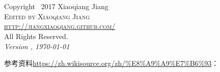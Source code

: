 \documentclass[8pt]{book}
\makeatletter
\renewcommand{\cleardoublepage}{
	\clearpage\ifodd\c@page\else
	\hbox{}
	\vspace*{\fill}
	\thispagestyle{empty}
	\newpage
	\fi}
\numberwithin{dummy}{section}
\theoremstyle{ocrenumbox}
\theoremstyle{blacknumex}
\theoremstyle{blacknumbox}
\theoremstyle{ocrenum}
\newif\ifusechapterimage
\newcommand{\thechapterimage}{}%
\newcommand{\chapterimage}[1]{\ifusechapterimage\renewcommand{\thechapterimage}{#1}\fi}%
\makeatother
\begin{document}

\newpage
~\vfill
\thispagestyle{empty}


\newpage
~\vfill
\thispagestyle{empty}

\noindent Copyright \textcopyright\ 2017 Xiaoqiang Jiang\\ %

\noindent \textsc{Edited by Xiaoqiang Jiang}\\ %

\noindent \textsc{\url{http://jiangxiaoqiang.github.com/}}\\

\noindent All Rights Reserved.\\ %

\noindent \textit{Version \currenttime, \today} %




\chapterimage{chapterhead1.pdf} %

\pagestyle{empty} %

\tableofcontents %

\cleardoublepage %

\pagestyle{fancy} %


参考资料\url{https://zh.wikisource.org/zh/%E8%A9%A9%E7%B6%93}：


\mainmatter
\end{document}
